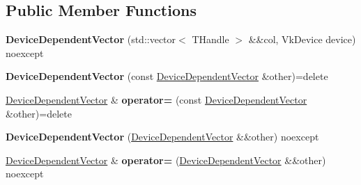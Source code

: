\subsection*{Public Member Functions}
\begin{DoxyCompactItemize}
\item 
\mbox{\label{structblaze_1_1vkw_1_1base_1_1DeviceDependentVector_abe90751a1103c60604aec58eee935254}} 
{\bfseries Device\+Dependent\+Vector} (std\+::vector$<$ T\+Handle $>$ \&\&col, Vk\+Device device) noexcept
\item 
\mbox{\label{structblaze_1_1vkw_1_1base_1_1DeviceDependentVector_a2c56d257e7ff648ace2d6a9c69e382fb}} 
{\bfseries Device\+Dependent\+Vector} (const \hyperlink{structblaze_1_1vkw_1_1base_1_1DeviceDependentVector}{Device\+Dependent\+Vector} \&other)=delete
\item 
\mbox{\label{structblaze_1_1vkw_1_1base_1_1DeviceDependentVector_a681e728084d947ddd3436f8c2ff7a886}} 
\hyperlink{structblaze_1_1vkw_1_1base_1_1DeviceDependentVector}{Device\+Dependent\+Vector} \& {\bfseries operator=} (const \hyperlink{structblaze_1_1vkw_1_1base_1_1DeviceDependentVector}{Device\+Dependent\+Vector} \&other)=delete
\item 
\mbox{\label{structblaze_1_1vkw_1_1base_1_1DeviceDependentVector_ac975f9eef1083c90b6e68438b8a8e7eb}} 
{\bfseries Device\+Dependent\+Vector} (\hyperlink{structblaze_1_1vkw_1_1base_1_1DeviceDependentVector}{Device\+Dependent\+Vector} \&\&other) noexcept
\item 
\mbox{\label{structblaze_1_1vkw_1_1base_1_1DeviceDependentVector_a8b0780eeec6261857104165255ca61b7}} 
\hyperlink{structblaze_1_1vkw_1_1base_1_1DeviceDependentVector}{Device\+Dependent\+Vector} \& {\bfseries operator=} (\hyperlink{structblaze_1_1vkw_1_1base_1_1DeviceDependentVector}{Device\+Dependent\+Vector} \&\&other) noexcept
\item 
\mbox{\label{structblaze_1_1vkw_1_1base_1_1DeviceDependentVector_ae2db700663b306b10a6789db01e46673}} 

\end{DoxyCompactItemize}
